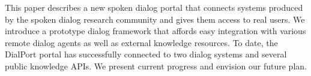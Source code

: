 This paper describes a new spoken dialog portal that connects systems produced by the spoken dialog research community and gives them access to real users. We introduce a prototype dialog framework that affords easy integration with various remote dialog agents as well as external knowledge resources. To date, the DialPort portal has successfully connected to two dialog systems and several public knowledge APIs. We present current progress and envision our future plan.
